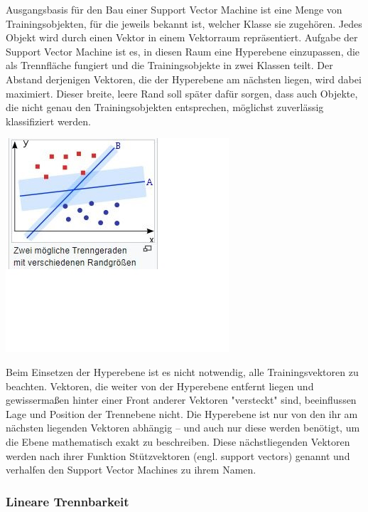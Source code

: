 \documentclass[12pt]{article}
\begin{document}
Ausgangsbasis für den Bau einer Support Vector Machine ist eine Menge von Trainingsobjekten, für die jeweils bekannt ist, welcher Klasse sie zugehören. Jedes Objekt wird durch einen Vektor in einem Vektorraum repräsentiert. Aufgabe der Support Vector Machine ist es, in diesen Raum eine Hyperebene einzupassen, die als Trennfläche fungiert und die Trainingsobjekte in zwei Klassen teilt. Der Abstand derjenigen Vektoren, die der Hyperebene am nächsten liegen, wird dabei maximiert. Dieser breite, leere Rand soll später dafür sorgen, dass auch Objekte, die nicht genau den Trainingsobjekten entsprechen, möglichst zuverlässig klassifiziert werden.
\begin{center} 
\includegraphics{SVM-Konzept} 
\end{center}
Beim Einsetzen der Hyperebene ist es nicht notwendig, alle Trainingsvektoren zu beachten. Vektoren, die weiter von der Hyperebene entfernt liegen und gewissermaßen hinter einer Front anderer Vektoren "versteckt" sind, beeinflussen Lage und Position der Trennebene nicht. Die Hyperebene ist nur von den ihr am nächsten liegenden Vektoren abhängig – und auch nur diese werden benötigt, um die Ebene mathematisch exakt zu beschreiben. Diese nächstliegenden Vektoren werden nach ihrer Funktion Stützvektoren (engl. support vectors) genannt und verhalfen den Support Vector Machines zu ihrem Namen.

\subsubsection{Lineare Trennbarkeit}
\end{document}

